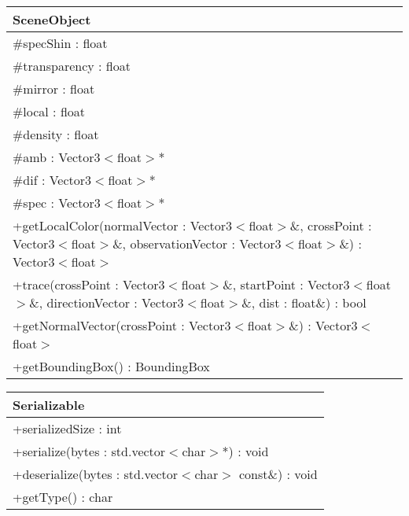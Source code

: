 \begin{center}
    \begin{tabular}{|l|}
    \hline
    SceneObject \\ \hline
    \#specShin : float \\
    \#transparency : float \\
    \#mirror : float \\
    \#local : float \\
    \#density : float \\
    \#amb : Vector3$<$float$>$* \\
    \#dif : Vector3$<$float$>$* \\
    \#spec : Vector3$<$float$>$* \\
    \hline
	+getLocalColor(normalVector : Vector3$<$float$>$\&, crossPoint : Vector3$<$float$>$\&, observationVector : Vector3$<$float$>$\&) : Vector3$<$float$>$ \\
	+trace(crossPoint : Vector3$<$float$>$\&, startPoint : Vector3$<$float$>$\&, directionVector : Vector3$<$float$>$\&, dist : float\&) : bool \\
	+getNormalVector(crossPoint : Vector3$<$float$>$\&) : Vector3$<$float$>$ \\
	+getBoundingBox() : BoundingBox \\
	\hline
    \end{tabular}
\end{center}

\begin{center}
    \begin{tabular}{|l|}
    \hline
    Serializable \\ \hline
    +serializedSize : int \\ \hline
	+serialize(bytes : std.vector$<$char$>$*) : void \\ 
	+deserialize(bytes : std.vector$<$char$>$ const\&) : void \\
	+getType() : char \\
	\hline
    \end{tabular}
\end{center}

